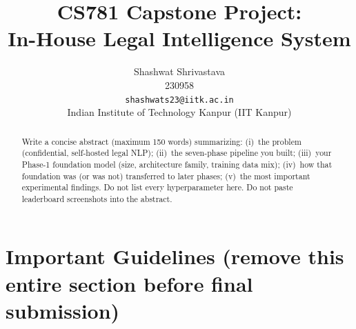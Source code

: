 \documentclass[11pt, oneside]{article}
\title{CS781 Capstone Project:\\
In-House Legal Intelligence System}
\author{
    Shashwat Shrivastava  \\
    230958 \\
    {\tt shashwats23@iitk.ac.in}\\
    Indian Institute of Technology Kanpur (IIT Kanpur)
}
\date{}
\begin{document}
\maketitle
\begin{abstract}
Write a concise abstract (maximum 150 words) summarizing:
(i)~the problem (confidential, self-hosted legal NLP);
(ii)~the seven-phase pipeline you built;
(iii)~your Phase-1 foundation model (size, architecture family, training data mix);
(iv)~how that foundation was (or was not) transferred to later phases;
(v)~the most important experimental findings.
Do not list every hyperparameter here. Do not paste leaderboard screenshots into the abstract.
\end{abstract}
\section*{Important Guidelines
(remove this entire section before final submission)}
\end{document}
